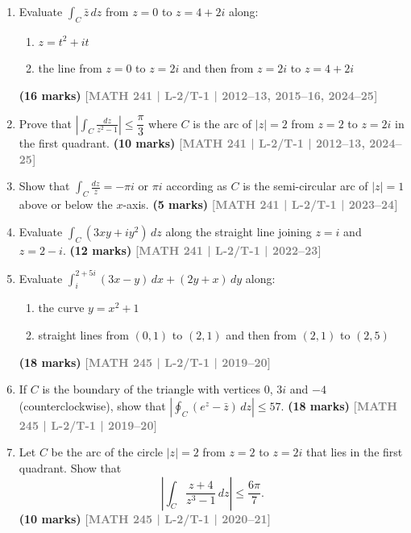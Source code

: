 \documentclass[12pt]{article}
\newcommand{\yr}[1]{\hfill\textcolor{gray}{\small\textbf{[#1]}}}
\newcommand{\mk}[1]{\textcolor{orange!70!black}{\small\textbf{(#1 marks)}}}
\begin{document}
\begin{enumerate}

  \item Evaluate $\displaystyle\int_{C}\bar{z}\,dz$ from $z=0$ to $z=4+2i$ along: 
\begin{enumerate}
  \item $z=t^{2}+it$
  \item the line from $z=0$ to $z=2i$ and then from $z=2i$ to $z=4+2i$
\end{enumerate}
\mk{16} \yr{MATH 241 | L-2/T-1 | 2012--13, 2015--16, 2024--25}



\item Prove that $\left|\displaystyle\int_{C}\frac{dz}{z^{2}-1}\right|\le\dfrac{\pi}{3}$ where $C$ is the arc of $|z|=2$ from $z=2$ to $z=2i$ in the first quadrant.
\mk{10} \yr{MATH 241 | L-2/T-1 | 2012--13, 2024--25}



\item Show that $\displaystyle\int_{C}\frac{dz}{z}=-\pi i$ or $\pi i$ according as $C$ is the semi-circular arc of $|z|=1$ above or below the $x$-axis.
\mk{5} \yr{MATH 241 | L-2/T-1 | 2023--24}



\item Evaluate $\displaystyle\int_{C}(3xy+iy^{2})\,dz$ along the straight line joining $z=i$ and $z=2-i$.
\mk{12} \yr{MATH 241 | L-2/T-1 | 2022--23}



\item Evaluate $\displaystyle\int_{i}^{2+5i}(3x-y)\,dx+(2y+x)\,dy$ along: 
\begin{enumerate}
  \item the curve $y=x^{2}+1$
  \item straight lines from $(0,1)$ to $(2,1)$ and then from $(2,1)$ to $(2,5)$
\end{enumerate}
\mk{18} \yr{MATH 245 | L-2/T-1 | 2019--20}



\item If $C$ is the boundary of the triangle with vertices $0$, $3i$ and $-4$ (counterclockwise), show that $\left|\displaystyle\oint_{C}(e^{z}-\bar{z})\,dz\right|\le 57$.
\mk{18} \yr{MATH 245 | L-2/T-1 | 2019--20}

  

\item Let $C$ be the arc of the circle $|z|=2$ from $z=2$ to $z=2i$ that lies in the first quadrant. Show that
\[
\left|\int_{C} \frac{z+4}{z^{3}-1}\,dz\right| \leq \frac{6\pi}{7}.
\]
\mk{10} \yr{MATH 245 | L-2/T-1 | 2020--21}




\end{enumerate}
\end{document}
